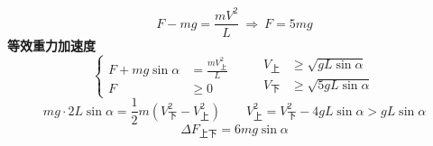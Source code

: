 \[ F-mg=\frac{mV^2}{L}\ \Rightarrow\ F=5mg \]
\textbf{等效重力加速度}
\[ \left\{\begin{aligned}F+mg\sin\alpha&=\frac{mV_{\text{上}}^2}{L}\\ F&\ge0\end{aligned}\right. \qquad \begin{aligned}V_{\text{上}}&\ge\sqrt{gL\sin\alpha}\\ V_{\text{下}}&\ge\sqrt{5gL\sin\alpha}\end{aligned} \]
\[ mg\cdot2L\sin\alpha=\frac{1}{2}m(V_{\text{下}}^2-V_{\text{上}}^2)\qquad V_{\text{上}}^2=V_{\text{下}}^2-4gL\sin\alpha>gL\sin\alpha \] %
\[ \Delta F_{\text{上下}}=6mg\sin\alpha \]
